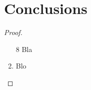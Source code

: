 \documentclass[twoside]{ctuthesis}
\theoremstyle{plain}
\theoremstyle{definition}
\theoremstyle{note}
\begin{document}
\chapter{Conclusions}


\medskip

\begin{proof}\begin{enumerate} \item[8] Bla \item Blo \end{enumerate} \end{proof}

\appendix

\printindex

\appendix

%



\end{document}
